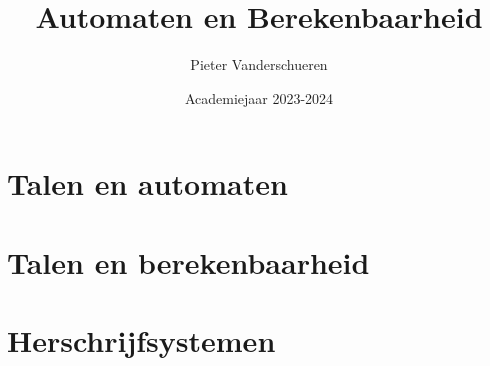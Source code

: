 \documentclass{exam}
\title{Automaten en Berekenbaarheid}
\author{Pieter Vanderschueren}
\date{Academiejaar 2023-2024}
\begin{document}
\begin{titlingpage}
\maketitle
\end{titlingpage}

\newpage

    


\newpage

\tableofcontents

\newpage


\section{Talen en automaten}

\vspace{0.5cm}



\newpage

\section{Talen en berekenbaarheid}

\vspace{0.5cm}



\newpage

\section{Herschrijfsystemen}
\end{document}
